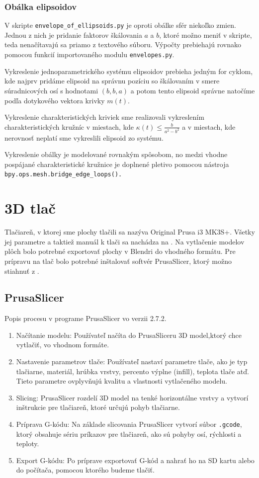 \subsubsection*{Obálka elipsoidov}
V skripte \verb|envelope_of_ellipsoids.py| je oproti obálke sfér niekoľko zmien. Jednou z nich je pridanie faktorov škálovania $a$ a $b$, ktoré možno meniť v skripte, teda nenačítavajú sa priamo z textového súboru. Výpočty prebiehajú rovnako pomocou funkcií importovaného modulu \verb|envelopes.py|.

Vykreslenie jednoparametrického systému elipsoidov prebieha jedným for cyklom, kde najprv pridáme elipsoid na správnu pozíciu so škálovaním v smere súradnicových osí s hodnotami $(b, b, a)$ a potom tento elipsoid správne natočíme podľa dotykového vektora krivky $m(t).$  

Vykreslenie charakteristických kriviek sme realizovali vykreslením charakteristických kružníc v miestach, kde
$\kappa(t) \leq \frac{b}{a^2-b^2}$ a v miestach, kde nerovnosť neplatí sme vykreslili elipsoid zo systému.

Vykreslenie obálky je modelované rovnakým spôsobom, no medzi vhodne pospájané charakteristické kružnice je doplnené pletivo pomocou nástroja \verb|bpy.ops.mesh.bridge_edge_loops().|  

\section{3D tlač}
Tlačiareň, v ktorej sme plochy tlačili sa nazýva Original Prusa i3 MK3S+. Všetky jej parametre a taktiež manuál k tlači sa nachádza na \cite{PrusaManual}. Na vytlačenie modelov plôch bolo potrebné exportovať plochy v Blendri do vhodného formátu. Pre prípravu na tlač bolo potrebné inštalovať softvér PrusaSlicer, ktorý možno stiahnuť z \cite{PrusaSlicer}.
\subsection{PrusaSlicer}
Popis procesu v programe PrusaSlicer vo verzii 2.7.2.
\begin{enumerate}
\item Načítanie modelu: Používateľ načíta do PrusaSliceru 3D model,ktorý chce vytlačiť, vo vhodnom formáte.

\item Nastavenie parametrov tlače: Používateľ nastaví parametre tlače, ako je typ tlačiarne, materiál, hrúbka vrstvy, percento výplne (infill), teplota tlače atď. Tieto parametre ovplyvňujú kvalitu a vlastnosti vytlačeného modelu.

\item Slicing: PrusaSlicer rozdelí 3D model na tenké horizontálne vrstvy a vytvorí inštrukcie pre tlačiareň, ktoré určujú pohyb tlačiarne. 

\item Príprava G-kódu: Na základe slicovania PrusaSlicer vytvorí súbor \verb|.gcode|, ktorý obsahuje sériu príkazov pre tlačiareň, ako sú pohyby osí, rýchlosti a teploty.

\item Export G-kódu: Po príprave exportovať G-kód a nahrať ho na SD kartu alebo do počítača, pomocou ktorého budeme tlačiť.
\end{enumerate}


